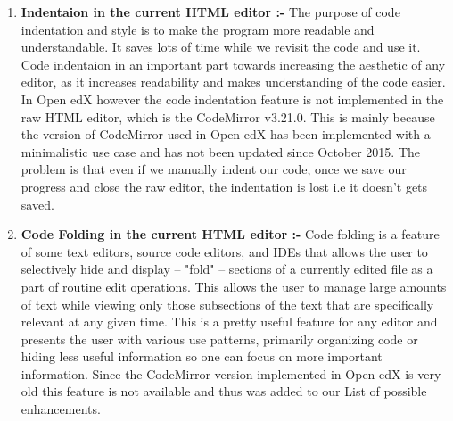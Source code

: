 \begin{enumerate}
  \item \textbf{Indentaion in the current HTML editor :-}\newline\newline
The purpose of code indentation and style is to make the program more readable and
understandable. It saves lots of time while we revisit the code and use it.
Code indentaion in an important part towards increasing the aesthetic of any editor,
as it increases readability and makes understanding of the code easier.\newline\newline
In Open edX however the code indentation feature is not implemented in the raw
HTML editor, which is the CodeMirror v3.21.0. This is mainly because the version
of CodeMirror used in Open edX has been implemented with a minimalistic use case
and has not been updated since October 2015. The problem is that even if we
manually indent our code, once we save our progress and close the raw editor, the
indentation is lost i.e it doesn’t gets saved. 

  \item \textbf{Code Folding in the current HTML editor :-}\newline\newline
Code folding is a feature of some text editors, source code editors, and IDEs that
allows the user to selectively hide and display – "fold" – sections of a currently edited
file as a part of routine edit operations. This allows the user to manage large
amounts of text while viewing only those subsections of the text that are specifically
relevant at any given time.\newline\newline
This is a pretty useful feature for any editor and presents the user with various use
patterns, primarily organizing code or hiding less useful information so one can
focus on more important information. Since the CodeMirror version implemented in
Open edX is very old this feature is not available and thus was added to our List of
possible enhancements.


\end{enumerate}

